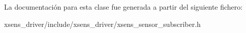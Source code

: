 \-La documentación para esta clase fue generada a partir del siguiente fichero\-:\begin{DoxyCompactItemize}
\item 
xsens\-\_\-driver/include/xsens\-\_\-driver/xsens\-\_\-sensor\-\_\-subscriber.\-h\end{DoxyCompactItemize}
